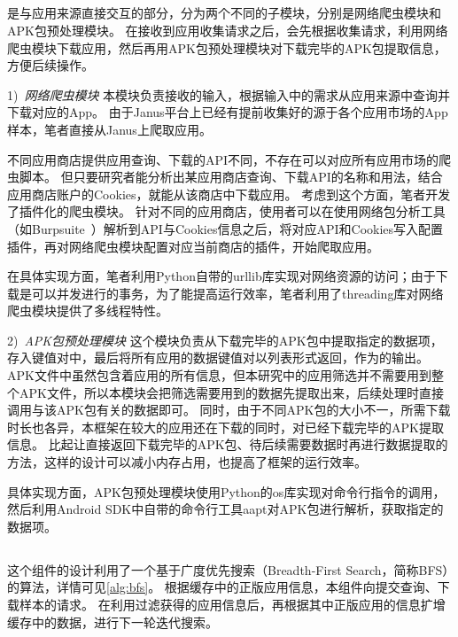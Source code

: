 \subsection{\componentA }
\componentA 是与应用来源直接交互的部分，分为两个不同的子模块，分别是网络爬虫模块和APK包预处理模块。
在接收到应用收集请求之后，\componentA 会先根据收集请求，利用网络爬虫模块下载应用，然后再用APK包预处理模块对下载完毕的APK包提取信息，方便后续操作。

1)\ \emph{网络爬虫模块} \quad
本模块负责接收\componentA 的输入，根据输入中的需求从应用来源中查询并下载对应的App。
由于Janus平台上已经有提前收集好的源于各个应用市场的App样本，笔者直接从Janus上爬取应用。

不同应用商店提供应用查询、下载的API不同，不存在可以对应所有应用市场的爬虫脚本。
但只要研究者能分析出某应用商店查询、下载API的名称和用法，结合应用商店账户的Cookies，就能从该商店中下载应用。
考虑到这个方面，笔者开发了插件化的爬虫模块。
针对不同的应用商店，使用者可以在使用网络包分析工具（如Burpsuite~\cite{burpsuite}）解析到API与Cookies信息之后，将对应API和Cookies写入配置插件，再对网络爬虫模块配置对应当前商店的插件，开始爬取应用。

在具体实现方面，笔者利用Python自带的urllib库实现对网络资源的访问；由于下载是可以并发进行的事务，为了能提高运行效率，笔者利用了threading库对网络爬虫模块提供了多线程特性。

2)\ \emph{APK包预处理模块} \quad
这个模块负责从下载完毕的APK包中提取指定的数据项，存入键值对中，最后将所有应用的数据键值对以列表形式返回，作为\componentA 的输出。
APK文件中虽然包含着应用的所有信息，但本研究中的应用筛选并不需要用到整个APK文件，所以本模块会把筛选需要用到的数据先提取出来，后续处理时直接调用与该APK包有关的数据即可。
同时，由于不同APK包的大小不一，所需下载时长也各异，本框架在较大的应用还在下载的同时，对已经下载完毕的APK提取信息。
比起让\componentA 直接返回下载完毕的APK包、待后续需要数据时再进行数据提取的方法，这样的设计可以减小内存占用，也提高了框架的运行效率。

具体实现方面，APK包预处理模块使用Python的os库实现对命令行指令的调用，然后利用Android SDK中自带的命令行工具aapt对APK包进行解析，获取指定的数据项。


\subsection{\componentB }
这个组件的设计利用了一个基于广度优先搜索（Breadth-First Search，简称BFS）的算法，详情可见\autoref{alg:bfs}。
根据缓存中的正版应用信息，本组件向\componentA 提交查询、下载样本的请求。
在利用\componentC 过滤获得的应用信息后，再根据其中正版应用的信息扩增缓存中的数据，进行下一轮迭代搜索。

